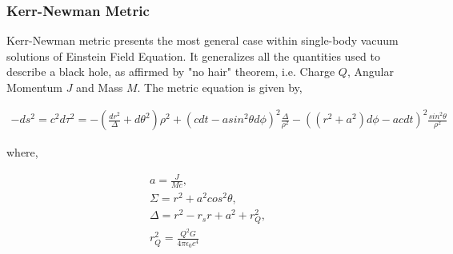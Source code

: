 \documentclass{aastex63}
\begin{document}




\subsubsection{Kerr-Newman Metric}\label{subsubsec:kerrnewman}
Kerr-Newman metric presents the most general case within single-body vacuum solutions of Einstein Field Equation. It generalizes all the quantities used to describe a black hole, as affirmed by "no hair" theorem, i.e. Charge $Q$, Angular Momentum $J$ and Mass $M$. The metric equation is given by,

\begin{gather}
-ds^2 = c^2 d\tau^2 = -(\frac{dr^2}{\Delta}+d\theta^2)\rho^2 + (c dt - a sin^2 \theta d\phi)^2 \frac{\Delta}{\rho^2} - ((r^2 + a^2)d\phi - ac dt)^2 \frac{sin^2 \theta}{\rho^2}
\end{gather}

where,

\begin{gather}
a = \frac{J}{Mc}, \nonumber \\
\Sigma = r^2 + a^2 cos^2 \theta , \nonumber  \\
\Delta  = r^2 - r_s r + a^2 + r_Q ^ 2, \nonumber \\
r_Q ^ 2 = \frac{Q^2 G}{4\pi\epsilon_0 c^4} \nonumber
\end{gather}
\end{document}
